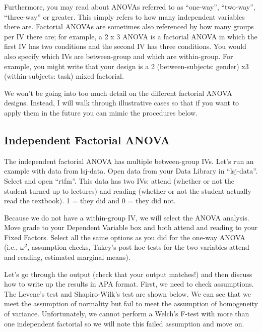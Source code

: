 \documentclass[
]{book}
\begin{document}
Furthermore, you may read about ANOVAs referred to as ``one-way'', ``two-way'', ``three-way'' or greater. This simply refers to how many independent variables there are. Factorial ANOVAs are sometimes also referenced by how many groups per IV there are; for example, a 2 x 3 ANOVA is a factorial ANOVA in which the first IV has two conditions and the second IV has three conditions. You would also specify which IVs are between-group and which are within-group. For example, you might write that your design is a 2 (between-subjects: gender) x3 (within-subjects: task) mixed factorial.

We won't be going into too much detail on the different factorial ANOVA designs. Instead, I will walk through illustrative cases so that if you want to apply them in the future you can mimic the procedures below.

\hypertarget{independent-factorial-anova}{%
\subsection{Independent Factorial ANOVA}\label{independent-factorial-anova}}

The independent factorial ANOVA has multiple between-group IVs. Let's run an example with data from lsj-data. Open data from your Data Library in ``lsj-data''. Select and open ``rtfm''. This data has two IVs: attend (whether or not the student turned up to lectures) and reading (whether or not the student actually read the textbook). 1 = they did and 0 = they did not.

Because we do not have a within-group IV, we will select the ANOVA analysis. Move grade to your Dependent Variable box and both attend and reading to your Fixed Factors. Select all the same options as you did for the one-way ANOVA (i.e., \(\omega^2\), assumption checks, Tukey's post hoc tests for the two variables attend and reading, estimated marginal means).

Let's go through the output (check that your output matches!) and then discuss how to write up the results in APA format. First, we need to check assumptions. The Levene's test and Shapiro-Wilk's test are shown below. We can see that we meet the assumption of normality but fail to meet the assumption of homogeneity of variance. Unfortunately, we cannot perform a Welch's F-test with more than one independent factorial so we will note this failed assumption and move on.
\end{document}
